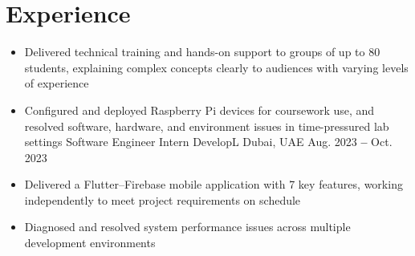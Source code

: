 \section{Experience}
\begin{itemize}[leftmargin=*]
  \compactSubheading
    {Computer Science Teaching Assistant}
    {Heriot-Watt University}
    {Dubai, UAE}
    {Sept. 2023 \textbf{--} Apr. 2024}
  \itemizeBegin
    \item Delivered technical training and hands-on support to groups of up to 80 students, explaining complex concepts clearly to audiences with varying levels of experience
    \item Configured and deployed Raspberry Pi devices for coursework use, and resolved software, hardware, and environment issues in time-pressured lab settings
  \itemizeEnd \vspace{-1em}
  \compactSubheading
    {Software Engineer Intern}
    {DevelopL}
    {Dubai, UAE}
    {Aug. 2023 \textbf{--} Oct. 2023}
  \itemizeBegin
    \item Delivered a Flutter--Firebase mobile application with 7 key features, working independently to meet project requirements on schedule
    \item Diagnosed and resolved system performance issues across multiple development environments
  \itemizeEnd
\end{itemize}